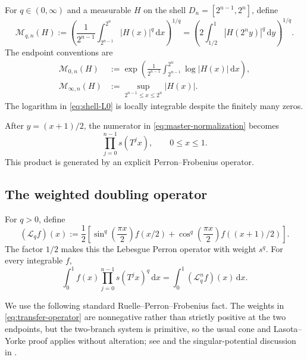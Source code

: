 \documentclass[11pt,oneside]{article}
\theoremstyle{definition}
\theoremstyle{remark}
\newcommand{\dd}{\,\mathrm d}
\newcommand{\abs}[1]{\left|#1\right|}
\begin{document}
For $q\in(0,\infty)$ and a measurable $H$ on the shell
$D_n=[2^{n-1},2^n]$, define
\begin{equation}
 \mathcal M_{q,n}(H)
 :=\left(\frac1{2^{n-1}}\int_{2^{n-1}}^{2^n}\abs{H(x)}^q\dd x\right)^{1/q}
 =\left(2\int_{1/2}^{1}\abs{H(2^ny)}^q\dd y\right)^{1/q}.
 \label{eq:shell-Lq}
\end{equation}
The endpoint conventions are
\begin{align}
 \mathcal M_{0,n}(H)
 &:=\exp\!\left(\frac1{2^{n-1}}
       \int_{2^{n-1}}^{2^n}\log\abs{H(x)}\dd x\right),
 \label{eq:shell-L0}\\
 \mathcal M_{\infty,n}(H)
 &:=\sup_{2^{n-1}\le x\le2^n}\abs{H(x)}.
 \label{eq:shell-Linf}
\end{align}
The logarithm in \eqref{eq:shell-L0} is locally integrable despite the finitely many zeros.

After $y=(x+1)/2$, the numerator in \eqref{eq:master-normalization} becomes
\begin{equation}
 \prod_{j=0}^{n-1}s(T^jx),
 \qquad 0\le x\le1.
 \label{eq:forward-product}
\end{equation}
This product is generated by an explicit Perron--Frobenius operator.

\subsection{The weighted doubling operator}

For $q>0$, define
\begin{equation}
 (\mathcal L_q f)(x)
 :=\frac12\left[
   \sin^q\!\left(\frac{\pi x}{2}\right)f(x/2)
  +\cos^q\!\left(\frac{\pi x}{2}\right)f((x+1)/2)
 \right].
 \label{eq:transfer-operator}
\end{equation}
The factor $1/2$ makes this the Lebesgue Perron operator with weight $s^q$.
For every integrable $f$,
\begin{equation}
 \int_0^1 f(x)\prod_{j=0}^{n-1}s(T^jx)^q\dd x
 =\int_0^1(\mathcal L_q^n f)(x)\dd x.
 \label{eq:transfer-duality}
\end{equation}

We use the following standard Ruelle--Perron--Frobenius fact.  The weights in
\eqref{eq:transfer-operator} are nonnegative rather than strictly positive at the two
endpoints, but the two-branch system is primitive, so the usual cone and
Lasota--Yorke proof applies without alteration; see \cite[Chs.~2--3]{baladi} and the
singular-potential discussion in \cite{fan1997,fan-schmeling-shen}.
\end{document}
